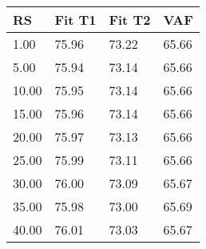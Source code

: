 \begin{tabular}{llll}
RS & Fit T1 & Fit T2 & VAF \\ 
\hline 
 1.00 & 75.96 & 73.22 & 65.66 \\ 
 5.00 & 75.94 & 73.14 & 65.66 \\ 
10.00 & 75.95 & 73.14 & 65.66 \\ 
15.00 & 75.96 & 73.14 & 65.66 \\ 
20.00 & 75.97 & 73.13 & 65.66 \\ 
25.00 & 75.99 & 73.11 & 65.66 \\ 
30.00 & 76.00 & 73.09 & 65.67 \\ 
35.00 & 75.98 & 73.00 & 65.69 \\ 
40.00 & 76.01 & 73.03 & 65.67 \\ 
\hline 
\end{tabular}